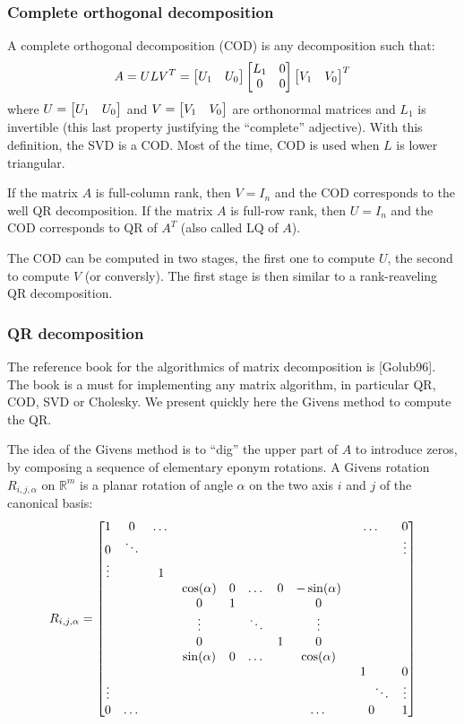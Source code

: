 \documentclass{book}
\begin{document}
\subsubsection{Complete orthogonal decomposition}

A complete orthogonal decomposition (COD) is any decomposition such that:
$$ A = ULV^T = \begin{bmatrix} U_1 & U_0 \end{bmatrix} \begin{bmatrix} L_1 & 0 \\ 0 & 0 \end{bmatrix} \begin{bmatrix} V_1 & V_0 \end{bmatrix}^T $$
where $U = \begin{bmatrix} U_1 & U_0 \end{bmatrix}$ and $V = \begin{bmatrix} V_1 & V_0 \end{bmatrix}$ are orthonormal matrices and $L_1$ is invertible (this last property justifying the ``complete'' adjective). With this definition, the SVD is a COD. Most of the time, COD is used when $L$ is lower triangular.

If the matrix $A$ is full-column rank, then $V=I_n$ and the COD corresponds to the well QR decomposition. If the matrix $A$ is full-row rank, then $U=I_n$ and the COD corresponds to QR of $A^T$ (also called LQ of $A$).

The COD can be computed in two stages, the first one to compute $U$, the second to compute $V$ (or conversly). The first stage is then similar to a rank-reaveling QR decomposition.

\subsubsection{QR decomposition}

The reference book for the algorithmics of matrix decomposition is [Golub96]. The book is a must for implementing any matrix algorithm, in particular QR, COD, SVD or Cholesky. We present quickly here the Givens method to compute the QR. 

The idea of the Givens method is to ``dig'' the upper part of $A$ to introduce zeros, by composing a sequence of elementary eponym rotations.
A Givens rotation $R_{i,j,\alpha}$ on $\mathbb{R}^m$ is a planar rotation of angle $\alpha$ on the two axis $i$ and $j$ of the canonical basis:
$$ R_{i,j,\alpha} = \begin{bmatrix} 
1 & 0      & \dots &              & & & & &  \dots & 0 \\
0 & \ddots &       &              & & & & & & \vdots \\
\vdots  &        & 1     &              & & & & & & \\
  &        &       & \cos(\alpha) &0& \dots  &0&-\sin(\alpha) & & \\
  &        &       & 0            &1&        & &0 & & \\
  &        &       & \vdots       & &\ddots  & &\vdots & & \\
  &        &       & 0            & &        &1&0 & & \\
  &        &       & \sin(\alpha) &0&\dots   & &\cos(\alpha) & & \\
  &        &       &              & &        & & &1 \ \ \ \ & 0\\
\vdots  &        &       &              & &        & & & \ \ \ \ \ \ddots & \vdots \\
0  &  \dots      &       &              & &        & & \dots& 0 &1  \\
\end{bmatrix}
$$
\end{document}
